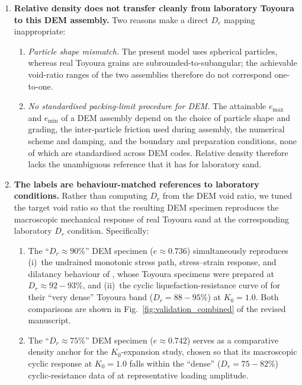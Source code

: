 \documentclass[11pt,a4paper]{article}
\begin{document}
\begin{enumerate}[leftmargin=*,label=(\arabic*),topsep=4pt,itemsep=6pt]
\item \textbf{Relative density does not transfer cleanly from laboratory Toyoura to this DEM assembly.}
Two reasons make a direct $D_r$ mapping inappropriate:
\begin{enumerate}[leftmargin=2em,label=(\alph*),topsep=2pt,itemsep=3pt]
  \item \emph{Particle shape mismatch.} The present model uses spherical particles, whereas real Toyoura grains are subrounded-to-subangular; the achievable void-ratio ranges of the two assemblies therefore do not correspond one-to-one.
  \item \emph{No standardised packing-limit procedure for DEM.} The attainable $e_{\max}$ and $e_{\min}$ of a DEM assembly depend on the choice of particle shape and grading, the inter-particle friction used during assembly, the numerical scheme and damping, and the boundary and preparation conditions, none of which are standardised across DEM codes. Relative density therefore lacks the unambiguous reference that it has for laboratory sand.
\end{enumerate}

\item \textbf{The labels are behaviour-matched references to laboratory conditions.}
Rather than computing $D_r$ from the DEM void ratio, we tuned the target void ratio so that the resulting DEM specimen reproduces the macroscopic mechanical response of real Toyoura sand at the corresponding laboratory $D_r$ condition. Specifically:
\begin{enumerate}[leftmargin=2em,label=(\alph*),topsep=2pt,itemsep=3pt]
  \item The ``$D_r \approx 90\%$'' DEM specimen ($e \approx 0.736$)
    simultaneously reproduces (i)~the undrained monotonic stress
    path, stress--strain response, and dilatancy behaviour of
    \citet{Nakata1998}, whose Toyoura specimens were prepared at
    $D_r \approx 92\!-\!93\%$, and (ii)~the cyclic
    liquefaction-resistance curve of \citet{Ishihara1985} for their
    ``very dense'' Toyoura band ($D_r = 88\!-\!95\%$) at
    $K_0 = 1.0$. Both comparisons are shown in
    Fig.~\ref{fig:validation_combined} of the revised manuscript.
  \item The ``$D_r \approx 75\%$'' DEM specimen ($e \approx 0.742$)
    serves as a comparative density anchor for the $K_0$-expansion
    study, chosen so that its macroscopic cyclic response at
    $K_0 = 1.0$ falls within the ``dense'' ($D_r = 75\!-\!82\%$)
    cyclic-resistance data of \citet{Ishihara1985} at representative
    loading amplitude.
\end{enumerate}


\end{enumerate}
\end{document}
